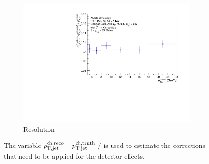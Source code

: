 \begin{figure}[tbh]
\begin{subfigure}{0.49\textwidth}
  \includegraphics[width=1.0\linewidth]{img/HQ16_Simulation_Resolution}
  \caption{Resolution}
  \label{fig:HQ16_Simulation_Resolution}
\end{subfigure}
\caption{The variable \(p_{\mathrm{T,jet}}^{\mathrm{ch,reco}} - p_{\mathrm{T,jet}}^{\mathrm{ch,truth}}\) / \ptchjetgen is used to estimate the corrections that need to be applied for the detector effects.}
\label{fig:DetectorResponse}
\end{figure}
